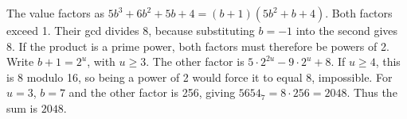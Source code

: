 The value factors as $5b^3+6b^2+5b+4=(b+1)(5b^2+b+4)$. Both factors exceed 1. Their gcd divides 8, because substituting $b=-1$ into the second gives 8. If the product is a prime power, both factors must therefore be powers of 2. Write $b+1=2^u$, with $u\ge3$. The other factor is $5\cdot2^{2u}-9\cdot2^u+8$. If $u\ge4$, this is 8 modulo 16, so being a power of 2 would force it to equal 8, impossible. For $u=3$, $b=7$ and the other factor is 256, giving $5654_7=8\cdot256=2048$. Thus the sum is $\boxed{2048}$.
